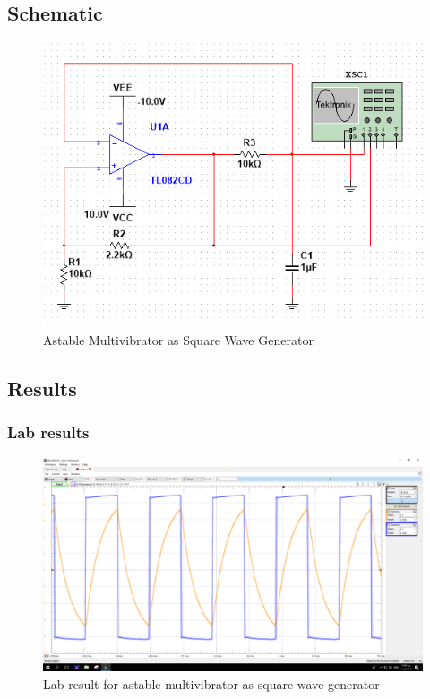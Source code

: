 \documentclass[a4paper, 12pt, english]{article}
\begin{document}
\subsection{Schematic}
\begin{figure}[H]
 \centering
 \includegraphics[width=\linewidth]{images/Square-Wave-Generator.png}
 \caption{Astable Multivibrator as Square Wave Generator}
 \label{fig:Astable Multivibrator as Square Wave Generator}
\end{figure}


\subsection{Results}

\subsubsection{Lab results}
\begin{figure}[H]
    \centering
    \includegraphics[width=\linewidth]{images/Square-Wave-Generator-Lab.png}
    \caption{Lab result for astable multivibrator as square wave generator}
    \label{fig:Lab result for astable multivibrator as square wave generator}
\end{figure}
\end{document}
